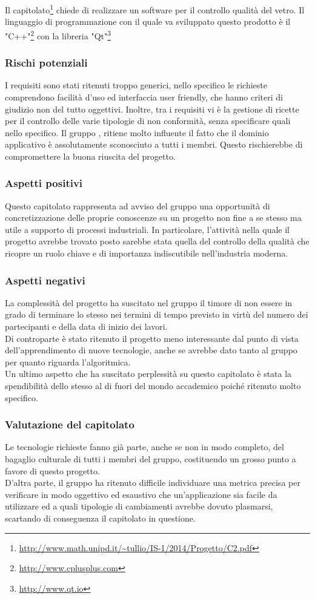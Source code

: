 Il capitolato\footnote{\url{http://www.math.unipd.it/~tullio/IS-1/2014/Progetto/C2.pdf}} chiede di realizzare un software per il controllo qualità del vetro. Il linguaggio di programmazione con il quale va sviluppato questo prodotto è il "C++"\footnote{\url{http://www.cplusplus.com}} con la libreria "Qt"\footnote{\url{http://www.qt.io}}
\subsubsection{Rischi potenziali}
I requisiti sono stati ritenuti troppo generici, nello specifico le richieste comprendono facilità d'uso ed interfaccia user friendly, che hanno criteri di giudizio non del tutto oggettivi.
Inoltre, tra i requisiti vi è la gestione di ricette per il controllo delle varie tipologie di non conformità, senza specificare quali nello specifico.
Il gruppo \GRUPPO, ritiene molto influente il fatto che il dominio applicativo è assolutamente sconosciuto a tutti i membri. Questo rischierebbe di compromettere la buona riuscita del progetto.
\subsubsection{Aspetti positivi}
Questo capitolato rappresenta ad avviso del gruppo una opportunità di concretizzazione delle proprie conoscenze su un progetto non fine a se stesso ma utile a supporto di processi industriali. In particolare, l’attività nella quale il progetto avrebbe trovato posto sarebbe stata quella del controllo della qualità che ricopre un ruolo chiave e di importanza indiscutibile nell'industria moderna.
\subsubsection{Aspetti negativi}
La complessità del progetto ha suscitato nel gruppo il timore di non essere in grado di terminare lo stesso nei termini di tempo previsto in virtù del numero dei partecipanti e della data di inizio dei lavori. \\
Di controparte è stato ritenuto il progetto meno interessante dal punto di vista dell’apprendimento di nuove tecnologie, anche se avrebbe dato tanto al gruppo per quanto riguarda l’algoritmica.\\
Un ultimo aspetto che ha suscitato perplessità su questo capitolato è stata la spendibilità dello stesso al di fuori del mondo accademico poiché ritenuto molto specifico.
\subsubsection{Valutazione del capitolato}
Le tecnologie richieste fanno già parte, anche se non in modo completo, del bagaglio culturale di tutti i membri del gruppo, costituendo un grosso punto a favore di questo progetto. \\
D’altra parte, il gruppo ha ritenuto difficile individuare una metrica precisa per verificare in modo oggettivo ed esaustivo che un’applicazione sia facile da utilizzare ed a quali tipologie di cambiamenti avrebbe dovuto plasmarsi, scartando di conseguenza il capitolato in questione.
